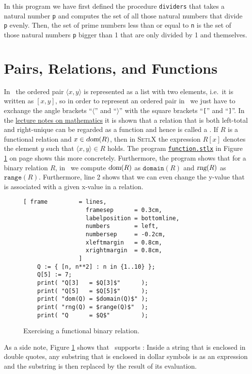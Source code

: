 In this program we have first defined the procedure \texttt{dividers} that takes a natural number
\texttt{p} and computes the set of all those natural numbers that divide \texttt{p} evenly.
Then, the set of prime numbers less than or equal to \texttt{n} is the set of those natural numbers
\texttt{p} bigger than 1 that are only divided by 1 and themselves.


\section{Pairs, Relations, and Functions}
In \setlx\ the ordered pair $\langle x, y \rangle$ is represented as a list with two elements,
i.e.~it is written as $[x,y]$, so in order to represent an ordered pair in \setlx\ we just have to
exchange the angle brackets ``$\langle$'' and ``$\rangle$'' with the square brackets ``\texttt{[}''
and ``\texttt{]}''.  In the
\href{https://github.com/karlstroetmann/Lineare-Algebra/blob/master/Script/lineare-algebra.pdf}{lecture
  notes on mathematics}  it is shown that a relation that is both left-total and 
right-unique can be regarded as a function and hence is called a .  If $R$
is a functional relation and $x \in \textsl{dom}(R)$, then in \textsc{SetlX} the expression  $R[x]$
denotes the  element $y$ such that $\langle x, y \rangle \in R$ holds. The program  
\href{https://github.com/karlstroetmann/Logik/blob/master/SetlX/function.stlx}{\texttt{function.stlx}}
in Figure \ref{fig:function.stlx} on page \pageref{fig:function.stlx} shows this more concretely.
Furthermore, the program shows that for a binary relation $R$, in \setlx\ we compute
$\textsl{dom}(R)$ as $\texttt{domain}(R)$ and $\textsl{rng}(R)$ as $\mathtt{range}(R)$.
Furthermore, line 2 shows that we can even change the y-value that is associated with a given
x-value in a relation.


\begin{figure}[!ht]
  \centering
\begin{Verbatim}[ frame         = lines, 
                  framesep      = 0.3cm, 
                  labelposition = bottomline,
                  numbers       = left,
                  numbersep     = -0.2cm,
                  xleftmargin   = 0.8cm,
                  xrightmargin  = 0.8cm,
                ]
    Q := { [n, n**2] : n in {1..10} };
    Q[5] := 7;
    print( "Q[3]   = $Q[3]$"      );
    print( "Q[5]   = $Q[5]$"      );
    print( "dom(Q) = $domain(Q)$" );
    print( "rng(Q) = $range(Q)$"  );
    print( "Q      = $Q$"         );

\end{Verbatim} 
\vspace*{-0.3cm}
\caption{Exercising a functional binary relation.}  \label{fig:function.stlx}
\end{figure} 
As a side note, Figure \ref{fig:function.stlx} shows that \setlx\ supports : 
Inside a string that is enclosed in double quotes, any substring that is enclosed in dollar symbols is
 as an expression and the substring is then replaced by the result of its evaluation.


